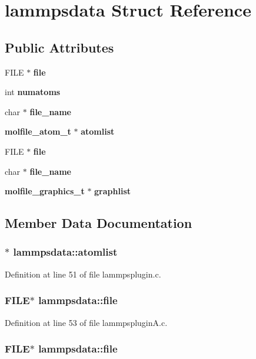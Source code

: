 \section{lammpsdata  Struct Reference}
\label{structlammpsdata}
\subsection*{Public Attributes}
\begin{CompactItemize}
\item 
FILE $\ast$ {\bf file}
\item 
int {\bf numatoms}
\item 
char $\ast$ {\bf file\_\-name}
\item 
{\bf molfile\_\-atom\_\-t} $\ast$ {\bf atomlist}
\item 
FILE $\ast$ {\bf file}
\item 
char $\ast$ {\bf file\_\-name}
\item 
{\bf molfile\_\-graphics\_\-t} $\ast$ {\bf graphlist}
\end{CompactItemize}


\subsection{Member Data Documentation}
\subsubsection{$\ast$ lammpsdata::atomlist}\label{structlammpsdata_m3}




Definition at line 51 of file lammpsplugin.c.
\subsubsection{\setlength{\rightskip}{0pt plus 5cm}FILE$\ast$ lammpsdata::file}\label{structlammpsdata_m4}




Definition at line 53 of file lammpsplugin\-A.c.
\subsubsection{\setlength{\rightskip}{0pt plus 5cm}FILE$\ast$ lammpsdata::file}\label{structlammpsdata_m0}




